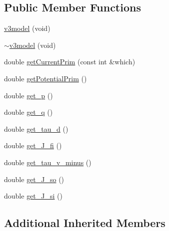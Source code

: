 \subsection*{Public Member Functions}
\begin{DoxyCompactItemize}
\item 
\hyperlink{classv3model_aa3c5a02561c2a8e14f80b599f35c8be3}{v3model} (void)
\item 
\hyperlink{classv3model_a78cbf845aa6ab504372a8710cad28f4b}{$\sim$v3model} (void)
\item 
double \hyperlink{classv3model_a14957985c821508b7a5985a423d0c942}{get\+Current\+Prim} (const int \&which)
\item 
double \hyperlink{classv3model_a7db295a02c2487b6eb4d13e6e942a088}{get\+Potential\+Prim} ()
\item 
double \hyperlink{classv3model_a18cfce2a9bc0536157da81cef399706a}{get\+\_\+p} ()
\item 
double \hyperlink{classv3model_ad969fd48215103f85ce383f11d759c99}{get\+\_\+q} ()
\item 
double \hyperlink{classv3model_a78dfba3662698b7967b683b975f473bb}{get\+\_\+tau\+\_\+d} ()
\item 
double \hyperlink{classv3model_a697f47117c9921dcb0e6da322a41ed1a}{get\+\_\+\+J\+\_\+fi} ()
\item 
double \hyperlink{classv3model_a1eb045a08d91e3677e25c298044046df}{get\+\_\+tau\+\_\+v\+\_\+minus} ()
\item 
double \hyperlink{classv3model_a0e4cf672a486a8334967c880606925a9}{get\+\_\+\+J\+\_\+so} ()
\item 
double \hyperlink{classv3model_ac852daced9f1246ce321d8245320b345}{get\+\_\+\+J\+\_\+si} ()
\end{DoxyCompactItemize}
\subsection*{Additional Inherited Members}


